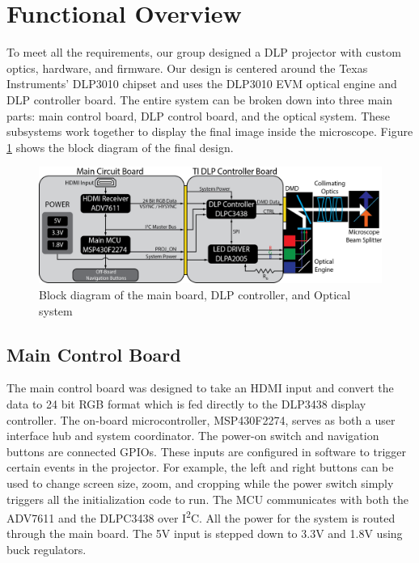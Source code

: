 \documentclass[12pt,a4paper]{article}
\begin{document}
\section{Functional Overview}
To meet all the requirements, our group designed a DLP projector with custom optics, hardware, and firmware. Our design is centered around the Texas Instruments’ DLP3010 chipset and uses the DLP3010 EVM optical engine and DLP controller board.  The entire system can be broken down into three main parts: main control board, DLP control board, and the optical system. These subsystems work together to display the final image inside the microscope. Figure \ref{block_diagram} shows the block diagram of the final design.

\begin{figure}[h!]
	\centering
	\includegraphics[width = \textwidth]{pics/seniorDesign_blockDiagram.png}
	\caption[Block Diagram]{Block diagram of the main board, DLP controller, and Optical system}
	\label{block_diagram}
\end{figure}


\subsection{Main Control Board}
The main control board was designed to take an HDMI input and convert the data to 24 bit RGB format which is fed directly to the DLP3438 display controller. The on-board microcontroller, MSP430F2274, serves as both a user interface hub and system coordinator. The power-on switch and navigation buttons are connected GPIOs. These inputs are configured in software to trigger certain events in the projector. For example, the left and right buttons can be used to change screen size, zoom, and cropping while the power switch simply triggers all the initialization code to run. The MCU communicates with both the ADV7611 and the DLPC3438 over I\textsuperscript{2}C. All the power for the system is routed through the main board. The 5V input is stepped down to 3.3V and 1.8V using buck regulators. 
\end{document}

